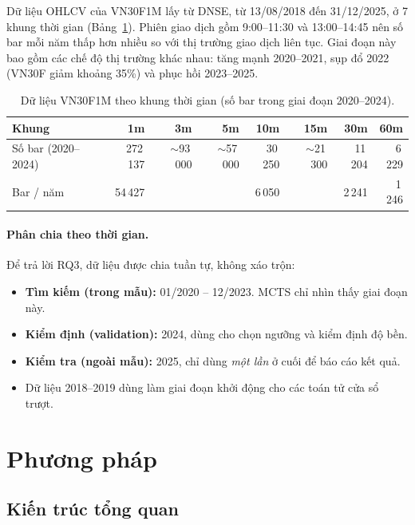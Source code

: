 \documentclass[12pt,a4paper]{article}
\begin{document}
Dữ liệu OHLCV của VN30F1M lấy từ DNSE, từ 13/08/2018 đến 31/12/2025, ở 7 khung thời gian (Bảng~\ref{tab:data}). Phiên giao dịch gồm 9:00–11:30 và 13:00–14:45 nên số bar mỗi năm thấp hơn nhiều so với thị trường giao dịch liên tục. Giai đoạn này bao gồm các chế độ thị trường khác nhau: tăng mạnh 2020–2021, sụp đổ 2022 (VN30F giảm khoảng 35\%) và phục hồi 2023–2025.

\begin{table}[H]
\centering
\caption{Dữ liệu VN30F1M theo khung thời gian (số bar trong giai đoạn 2020–2024).}
\label{tab:data}
\begin{tabular}{lrrrrrrr}
\toprule
Khung & 1m & 3m & 5m & 10m & 15m & 30m & 60m \\
\midrule
Số bar (2020–2024) & 272\,137 & $\sim$93\,000 & $\sim$57\,000 & 30\,250 & $\sim$21\,300 & 11\,204 & 6\,229 \\
Bar / năm & 54\,427 & & & 6\,050 & & 2\,241 & 1\,246 \\
\bottomrule
\end{tabular}
\end{table}

\paragraph{Phân chia theo thời gian.} Để trả lời RQ3, dữ liệu được chia tuần tự, không xáo trộn:
\begin{itemize}
  \item \textbf{Tìm kiếm (trong mẫu):} 01/2020 – 12/2023. MCTS chỉ nhìn thấy giai đoạn này.
  \item \textbf{Kiểm định (validation):} 2024, dùng cho chọn ngưỡng và kiểm định độ bền.
  \item \textbf{Kiểm tra (ngoài mẫu):} 2025, chỉ dùng \emph{một lần} ở cuối để báo cáo kết quả.
  \item Dữ liệu 2018–2019 dùng làm giai đoạn khởi động cho các toán tử cửa sổ trượt.
\end{itemize}

\section{Phương pháp}

\subsection{Kiến trúc tổng quan}
\end{document}
